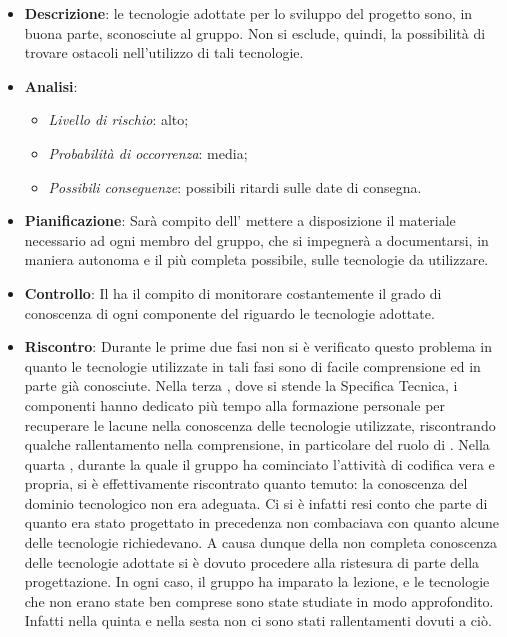 			\begin{itemize}
				\item \textbf{Descrizione}: le tecnologie adottate per lo sviluppo del progetto sono, in buona parte, sconosciute al gruppo. Non si esclude, quindi, la possibilità di trovare ostacoli nell'utilizzo di tali tecnologie.
				\item \textbf{Analisi}:
					\begin{itemize}
						\item \textit{Livello di rischio}: alto;
						\item \textit{Probabilità di occorrenza}: media;
						\item \textit{Possibili conseguenze}: possibili ritardi sulle date di consegna.
					\end{itemize}
				\item \textbf{Pianificazione}: Sarà compito dell' mettere a disposizione il materiale necessario ad ogni membro del gruppo, che si impegnerà a documentarsi, in maniera autonoma e il più completa possibile, sulle tecnologie da utilizzare.
				\item \textbf{Controllo}: Il  ha il compito di monitorare costantemente il grado di conoscenza di ogni componente del  riguardo le tecnologie adottate.
				\item \textbf{Riscontro}: Durante le prime due fasi non si è verificato questo problema in quanto le tecnologie utilizzate in tali fasi sono di facile comprensione ed in parte già conosciute. Nella terza , dove si stende la Specifica Tecnica, i componenti hanno dedicato più tempo alla formazione personale per recuperare le lacune nella conoscenza delle tecnologie utilizzate, riscontrando qualche rallentamento nella comprensione, in particolare del ruolo di . Nella quarta , durante la quale il gruppo ha cominciato l'attività di codifica vera e propria, si è effettivamente riscontrato quanto temuto: la conoscenza del dominio tecnologico non era adeguata. Ci si è infatti resi conto che parte di quanto era stato progettato in precedenza non combaciava con quanto alcune delle tecnologie richiedevano. A causa dunque della non completa conoscenza delle tecnologie adottate si è dovuto procedere alla ristesura di parte della progettazione. In ogni caso, il gruppo ha imparato la lezione, e le tecnologie che non erano state ben comprese sono state studiate in modo approfondito. Infatti nella quinta e nella sesta  non ci sono stati rallentamenti dovuti a ciò.
			\end{itemize}
